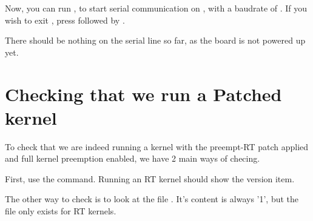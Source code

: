 Now, you can run , to start serial
communication on , with a baudrate of . If
you wish to exit , press \code{[Ctrl][a]} followed by
\code{[Ctrl][x]}.

There should be nothing on the serial line so far, as the board is not
powered up yet.

\section{Checking that we run a Patched kernel}

To check that we are indeed running a kernel with the preempt-RT patch applied and
full kernel preemption enabled, we have 2 main ways of checing.

First, use the  command. Running an RT kernel should show the  version item.

The other way to check is to look at the file . It's content is always '1', but the file only exists for RT kernels.

